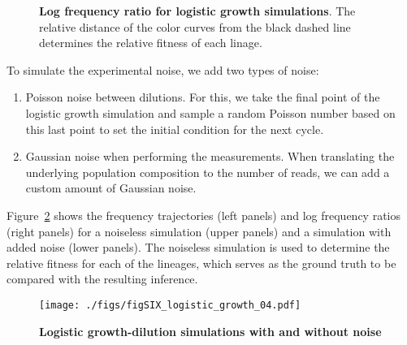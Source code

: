 \documentclass[
]{scrartcl}
\providecommand{\tightlist}{%
  \setlength{\itemsep}{0pt}\setlength{\parskip}{0pt}}\usepackage{longtable,booktabs,array}
\begin{document}
\begin{refsegment}
\begin{figure}
{}

\caption{\label{fig-SIX_logistic_growth_03}\textbf{Log frequency ratio
for logistic growth simulations}. The relative distance of the color
curves from the black dashed line determines the relative fitness of
each linage.}

\end{figure}

To simulate the experimental noise, we add two types of noise:

\begin{enumerate}
\def\labelenumi{\arabic{enumi}.}
\tightlist
\item
  Poisson noise between dilutions. For this, we take the final point of
  the logistic growth simulation and sample a random Poisson number
  based on this last point to set the initial condition for the next
  cycle.
\item
  Gaussian noise when performing the measurements. When translating the
  underlying population composition to the number of reads, we can add a
  custom amount of Gaussian noise.
\end{enumerate}

Figure~\ref{fig-SIX_logistic_growth_04} shows the frequency trajectories
(left panels) and log frequency ratios (right panels) for a noiseless
simulation (upper panels) and a simulation with added noise (lower
panels). The noiseless simulation is used to determine the relative
fitness for each of the lineages, which serves as the ground truth to be
compared with the resulting inference.

\begin{figure}

{\centering \texttt{[image: ./figs/figSIX\_logistic\_growth\_04.pdf]}

}

\caption{\label{fig-SIX_logistic_growth_04}\textbf{Logistic
growth-dilution simulations with and without noise}}

\end{figure}

\printbibliography[title={Supplemental References},
segment=\therefsegment, filter=notother]
\end{refsegment}
\end{document}
